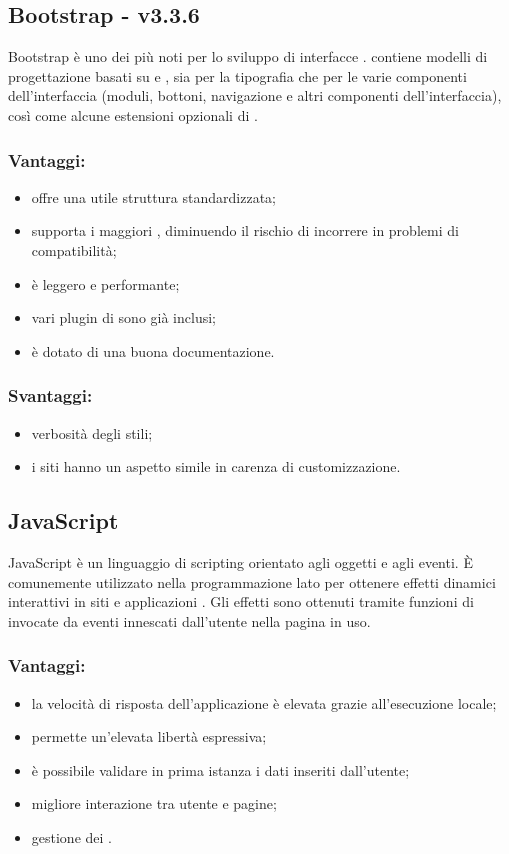 \documentclass[a4paper, titlepage]{article}
\begin{document}
\subsection{Bootstrap - v3.3.6}
Bootstrap è uno dei più noti  per lo sviluppo di interfacce .  contiene modelli di progettazione basati su  e , sia per la tipografia che per le varie componenti dell'interfaccia (moduli, bottoni, navigazione e altri componenti dell'interfaccia), così come alcune estensioni opzionali di .

\subsubsection{Vantaggi:} 
\begin{itemize}
	\item offre una utile struttura standardizzata;
	\item supporta i maggiori , diminuendo il rischio di incorrere in problemi di compatibilità;
	\item è leggero e performante;
	\item vari plugin di  sono già inclusi;
	\item è dotato di una buona documentazione.
\end{itemize}

\subsubsection{Svantaggi:}
\begin{itemize}
	\item verbosità degli stili;
	\item i siti hanno un aspetto simile in carenza di customizzazione.
\end{itemize}

\subsection{JavaScript}
JavaScript è un linguaggio di scripting orientato agli oggetti e agli eventi. È comunemente utilizzato nella programmazione  lato  per ottenere effetti dinamici interattivi in siti e applicazioni . Gli effetti sono ottenuti tramite funzioni di  invocate da eventi innescati dall'utente nella pagina  in uso.

\subsubsection{Vantaggi:} 
\begin{itemize}
	\item la velocità di risposta dell'applicazione è elevata grazie all'esecuzione locale;
	\item {} permette un'elevata libertà espressiva;
	\item è possibile validare in prima istanza i dati inseriti dall'utente;
	\item migliore interazione tra utente e pagine;
	\item gestione dei .
\end{itemize}
\end{document}
